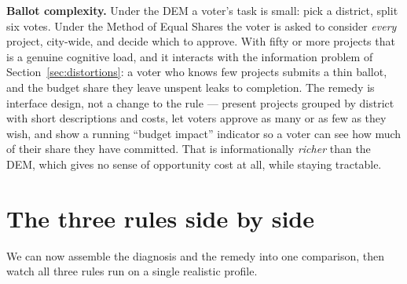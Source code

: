 \documentclass[11pt,letterpaper]{article}
\theoremstyle{definition}
\theoremstyle{plain}
\theoremstyle{remark}
\begin{document}
\medskip\noindent\textbf{Ballot complexity.} Under the DEM a voter's task is small: pick a district,
split six votes. Under the Method of Equal Shares the voter is asked to consider \emph{every} project,
city-wide, and decide which to approve. With fifty or more projects that is a genuine cognitive load,
and it interacts with the information problem of Section~\ref{sec:distortions}: a voter who knows few
projects submits a thin ballot, and the budget share they leave unspent leaks to completion. The
remedy is interface design, not a change to the rule --- present projects grouped by district with short
descriptions and costs, let voters approve as many or as few as they wish, and show a running ``budget
impact'' indicator so a voter can see how much of their share they have committed. That is
informationally \emph{richer} than the DEM, which gives no sense of opportunity cost at all, while
staying tractable.

\section{The three rules side by side}
\label{sec:comparison}

We can now assemble the diagnosis and the remedy into one comparison, then watch all three rules
run on a single realistic profile.
\end{document}
